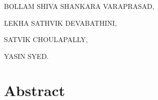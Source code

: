 \documentclass[a4paper, 12pt]{report}
\theoremstyle{definition}
\begin{document}
    
	\vspace{1cm}
	\begin{flushright}
        BOLLAM SHIVA SHANKARA VARAPRASAD,
        
		LEKHA SATHVIK DEVABATHINI,
        
        SATVIK CHOULAPALLY,
        
        YASIN SYED.
	\end{flushright}
	\listoffigures
	\listoftables
	\newpage

\chapter*{Abstract}
\end{document}
